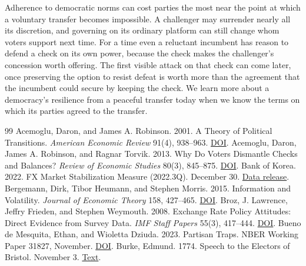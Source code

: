 \documentclass[11pt,letterpaper]{article}
\begin{document}
Adherence to democratic norms can cost parties the most near the point at which a voluntary transfer becomes impossible. A challenger may surrender nearly all its discretion, and governing on its ordinary platform can still change whom voters support next time. For a time even a reluctant incumbent has reason to defend a check on its own power, because the check makes the challenger's concession worth offering. The first visible attack on that check can come later, once preserving the option to resist defeat is worth more than the agreement that the incumbent could secure by keeping the check. We learn more about a democracy's resilience from a peaceful transfer today when we know the terms on which its parties agreed to the transfer.

\FloatBarrier
\begin{thebibliography}{99}\small\linespread{1.0}\selectfont
{} Acemoglu, Daron, and James A. Robinson. 2001. A Theory of Political Transitions. \emph{American Economic Review} 91(4), 938--963. \href{https://doi.org/10.1257/aer.91.4.938}{DOI}.
 Acemoglu, Daron, James A. Robinson, and Ragnar Torvik. 2013. Why Do Voters Dismantle Checks and Balances? \emph{Review of Economic Studies} 80(3), 845--875. \href{https://doi.org/10.1093/restud/rdt007}{DOI}.
 Bank of Korea. 2022. FX Market Stabilization Measure (2022.3Q). December 30. \href{https://www.bok.or.kr/eng/bbs/B0000298/view.do?nttId=10074700&menuNo=400374}{Data release}.
 Bergemann, Dirk, Tibor Heumann, and Stephen Morris. 2015. Information and Volatility. \emph{Journal of Economic Theory} 158, 427--465. \href{https://doi.org/10.1016/j.jet.2014.12.002}{DOI}.
 Broz, J. Lawrence, Jeffry Frieden, and Stephen Weymouth. 2008. Exchange Rate Policy Attitudes: Direct Evidence from Survey Data. \emph{IMF Staff Papers} 55(3), 417--444. \href{https://doi.org/10.1057/imfsp.2008.16}{DOI}.
 Bueno de Mesquita, Ethan, and Wioletta Dziuda. 2023. Partisan Traps. NBER Working Paper 31827, November. \href{https://doi.org/10.3386/w31827}{DOI}.
 Burke, Edmund. 1774. Speech to the Electors of Bristol. November 3. \href{https://press-pubs.uchicago.edu/founders/documents/v1ch13s7.html}{Text}.

\end{thebibliography}
\end{document}

